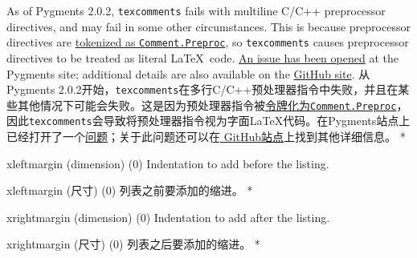 \begin{optionlist}
\begin{paracol}{2}
    As of Pygments 2.0.2, \texttt{texcomments} fails with multiline C/C++ preprocessor directives, and may fail in some other circumstances.  This is because preprocessor directives are \href{http://pygments.org/docs/tokens/}{tokenized as \texttt{Comment.Preproc}}, so \texttt{texcomments} causes preprocessor directives to be treated as literal \LaTeX\ code.  \href{https://bitbucket.org/birkenfeld/pygments-main/issue/1086/wrong-processing-of-in-c-c-macros-if-is}{An issue has been opened} at the Pygments site; additional details are also available on the \href{https://github.com/gpoore/minted/issues/66}{ GitHub site}.
    \switchcolumn
    从Pygments 2.0.2开始，\texttt{texcomments}在多行C/C++预处理器指令中失败，并且在某些其他情况下可能会失败。这是因为预处理器指令被\href{http://pygments.org/docs/tokens/}{令牌化为\texttt{Comment.Preproc}}，因此\texttt{texcomments}会导致将预处理器指令视为字面\LaTeX{}代码。在Pygments站点上已经打开了一个\href{https://bitbucket.org/birkenfeld/pygments-main/issue/1086/wrong-processing-of-in-c-c-macros-if-is}{问题}；关于此问题还可以在\href{https://github.com/gpoore/minted/issues/66}{ GitHub站点}上找到其他详细信息。
\switchcolumn[0]*%
  \item[xleftmargin (dimension) (0)]
    Indentation to add before the listing.
    \switchcolumn
    \item[xleftmargin (尺寸) (0)]
    列表之前要添加的缩进。
\switchcolumn[0]*%
  \item[xrightmargin (dimension) (0)]
    Indentation to add after the listing.
    \switchcolumn
    \item[xrightmargin (尺寸) (0)]
    列表之后要添加的缩进。
\switchcolumn[0]*%
\end{paracol}
\end{optionlist}



